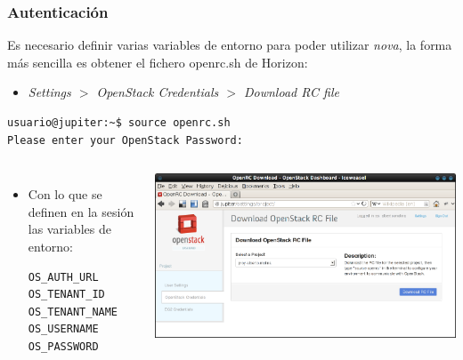 \documentclass{beamer}
\begin{document}
\begin{frame}[fragile]
  \frametitle{Autenticación}
  Es necesario definir varias variables de entorno para poder utilizar
  \textit{nova}, la forma más sencilla es obtener el fichero openrc.sh de
  Horizon:
  \begin{itemize}
  \item \textit{Settings $>$ OpenStack Credentials $>$ Download RC file}
  \end{itemize}
  \begin{lstlisting}[style=consola]
usuario@jupiter:~$ source openrc.sh 
Please enter your OpenStack Password:
  \end{lstlisting}
  \begin{columns}
    \begin{itemize}
    \item Con lo que se definen en la sesión las variables de entorno:
\begin{lstlisting}[style=salida]
OS_AUTH_URL
OS_TENANT_ID
OS_TENANT_NAME
OS_USERNAME
OS_PASSWORD
\end{lstlisting}
    \end{itemize}
    \includegraphics[width=\columnwidth]{../img/nova1.png}
  \end{columns}
\end{frame}
\end{document}
